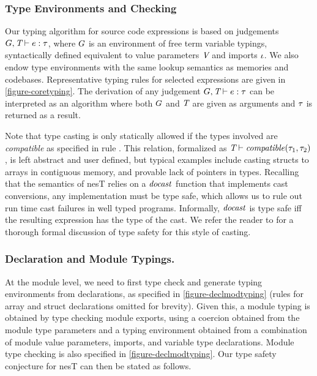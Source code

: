 \subsubsection{Type Environments and Checking} Our typing algorithm for source code expressions
is based on judgements $G,\textit{T} \vdash e : \tau$, where $G$ is an environment of free
term variable typings, syntactically defined equivalent to value parameters $\textit{V}$ and
imports $\iota$. We also endow type environments with the same lookup semantics as memories
and codebases. Representative typing rules for selected expressions are given in
\autoref{figure-coretyping}. The derivation of any judgement $G,\textit{T} \vdash e : \tau$ can
be interpreted as an algorithm where both $G$ and $\textit{T}$ are given as arguments and $\tau$
is returned as a result.

Note that type casting is only statically allowed if the types involved are \emph{compatible} as
specified in rule . This relation, formalized as $\textit{T} \vdash
\mathit{compatible}(\tau_1,\tau_2)$, is left abstract and user defined, but typical examples include
casting structs to arrays in contiguous memory, and provable lack of pointers in types.
Recalling that the semantics of nesT relies on a $\mathit{docast}$ function that implements cast
conversions, any implementation must be type safe, which allows us to rule out run time cast
failures in well typed programs. Informally, $\mathit{docast}$ is type safe iff the resulting
expression has the type of the cast. We refer the reader to \cite{FramedML} for a thorough
formal discussion of type safety for this style of casting.

\subsubsection{Declaration and Module Typings.} At the module level, we need to first type check
and generate typing environments from declarations, as specified in
\autoref{figure-declmodtyping} (rules for array and struct declarations omitted for brevity).
Given this, a module typing is obtained by type checking module exports, using a coercion
obtained from the module type parameters and a typing environment obtained from a combination of
module value parameters, imports, and variable type declarations. Module type checking is also
specified in \autoref{figure-declmodtyping}. Our type safety conjecture for nesT can then be
stated as follows.

